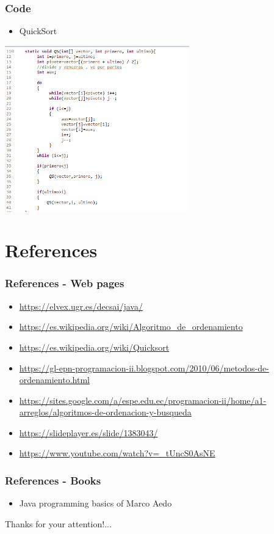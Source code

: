 \documentclass[11pt]{beamer}
\begin{document}
\begin{frame}
\frametitle{Code}
\begin{itemize}
\item QuickSort
\end{itemize}
\begin{center}
\includegraphics[width=8.0cm]{img/QS (2).png}
\end{center}
\end{frame}



\section{References}
\begin{frame}
\frametitle{References - Web pages}
\begin{itemize}
\item \url{https://elvex.ugr.es/decsai/java/}
\item \url{https://es.wikipedia.org/wiki/Algoritmo_de_ordenamiento}
\item \url{https://es.wikipedia.org/wiki/Quicksort}
\item \url{https://gl-epn-programacion-ii.blogspot.com/2010/06/metodos-de-ordenamiento.html}
\item \url{https://sites.google.com/a/espe.edu.ec/programacion-ii/home/a1-arreglos/algoritmos-de-ordenacion-y-busqueda}
\item \url{https://slideplayer.es/slide/1383043/}
\item \url{https://www.youtube.com/watch?v=_tUncS0AsNE}
\end{itemize}
\end{frame}

\begin{frame}
\frametitle{References - Books}
\begin{itemize}
\item { Java programming basics of Marco Aedo}
\end{itemize}
\end{frame}

\begin{frame}
\begin{center}
Thanks for your attention!...


\end{center}
\end{frame}
\end{document}
